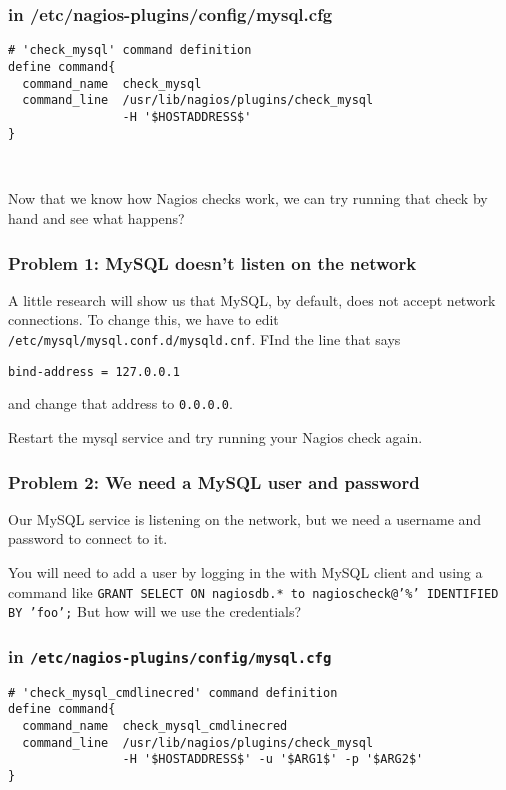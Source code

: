 \documentclass[10pt]{beamer}
\begin{document}
\begin{frame}[fragile]
  \frametitle{in /etc/nagios-plugins/config/mysql.cfg}

\begin{Verbatim}[commandchars=\\\[\]]
# 'check_mysql' command definition
define command{
  command_name  check_mysql
  command_line  /usr/lib/nagios/plugins/check_mysql
                -H '$HOSTADDRESS$' 
}



\end{Verbatim}

Now that we know how Nagios checks work, we can try
running that check by hand and see what happens?
\end{frame}

\begin{frame}[fragile]
  \frametitle{Problem 1: MySQL doesn't listen on the network}

  A little research will show us that MySQL, by default, does
  not accept network connections. To change this, we have to 
  edit \texttt{/etc/mysql/mysql.conf.d/mysqld.cnf}. FInd the line that
  says 
  
  \vskip 5mm
  \texttt{bind-address = 127.0.0.1}
  
  \vskip 5mm
  and change that address to \texttt{0.0.0.0}.
  
  \vskip 5mm
  Restart the mysql service and try running your Nagios check
  again.
\end{frame}


\begin{frame}[fragile]
  \frametitle{Problem 2: We need a MySQL user and password}
  
  Our MySQL service is listening on the network, but we need a username
  and password to connect to it.
  
  \vskip 5mm
  You will need to add a user by logging in the with MySQL 
  client and using a command like
  \vskip 5mm
  \texttt{GRANT SELECT ON nagiosdb.* to nagioscheck@'\%' IDENTIFIED BY 'foo';}
  \vskip 5mm
  But how will we use the credentials?
  
  \end{frame}
  
\begin{frame}[fragile]
  \frametitle{in \texttt{/etc/nagios-plugins/config/mysql.cfg}}

\begin{Verbatim}[commandchars=\\\[\]]
# 'check_mysql_cmdlinecred' command definition
define command{
  command_name  check_mysql_cmdlinecred
  command_line  /usr/lib/nagios/plugins/check_mysql
                -H '$HOSTADDRESS$' -u '$ARG1$' -p '$ARG2$'
}

\end{Verbatim}
\end{frame}
\end{document}
